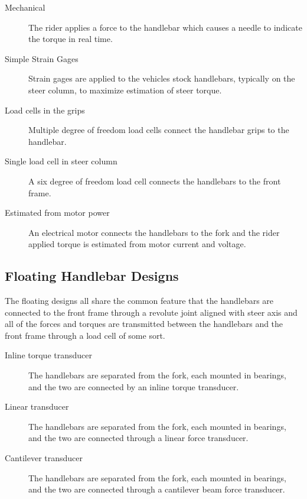 \documentclass[10pt]{article}
\begin{document}
\begin{description}
  \item[Mechanical] The rider applies a force to the handlebar which causes a
    needle to indicate the torque in real
    time.~\cite{Wilson-Jones1951,Cheng2003,Moore2012}
  \item[Simple Strain Gages] Strain gages are applied to the vehicles stock
    handlebars, typically on the steer column, to maximize estimation of steer
    torque.~\cite{Eaton1973,Lorenzo1997,Capitani2006}
  \item[Load cells in the grips] Multiple degree of freedom load cells connect
    the handlebar grips to the handlebar.~\cite{Evertse2010}
  \item[Single load cell in steer column] A six degree of freedom load cell
    connects the handlebars to the front frame.~\cite{Kageyama?}
  \item[Estimated from motor power] An electrical motor connects the handlebars
    to the fork and the rider applied torque is estimated from motor current
    and voltage.~\cite{Iuchi2006,Peterson2013,Schwab2013}
\end{description}


\subsection*{Floating Handlebar Designs}

The floating designs all share the common feature that the handlebars are
connected to the front frame through a revolute joint aligned with steer axis
and all of the forces and torques are transmitted between the handlebars and the
front frame through a load cell of some sort.

\begin{description}
  \item[Inline torque transducer] The handlebars are separated from the fork,
    each mounted in bearings, and the two are connected by an inline torque
    transducer.~\cite{Weir1979a,Cain2010,Cain2012,Moore2012}
  \item[Linear transducer] The handlebars are separated from the fork, each
    mounted in bearings, and the two are connected through a linear force
    transducer.~\cite{Cheng2003,James2002,Teerhuis2010}
  \item[Cantilever transducer] The handlebars are separated from the fork, each
    mounted in bearings, and the two are connected through a cantilever beam
    force transducer.~ \cite{Bortoluzzi2000,Biral2003,Ouden2011}
\end{description}
\end{document}
